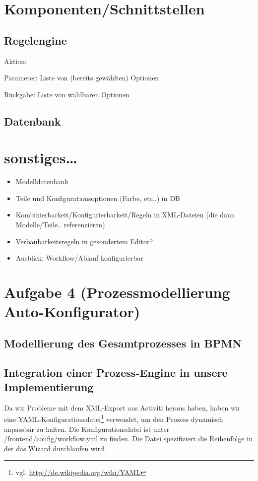 \documentclass[a4paper,10pt]{article}
\begin{document}
\section{Komponenten/Schnittstellen}

\subsection*{Regelengine}

Aktion:
 

Parameter:
 Liste von (bereits gewählten) Optionen

Rückgabe:
 Liste von wählbaren Optionen

\subsection*{Datenbank}


\section{sonstiges\ldots}
\begin{itemize}
 \item Modelldatenbank
 \item Teile und Konfigurationsoptionen (Farbe, etc..) in DB
 \item Kombinierbarkeit/Konfigurierbarkeit/Regeln in XML-Dateien (die dann Modelle/Teile.. referenzieren)
 \item Verbaubarkeitsregeln in gesondertem Editor?
 \item Ausblick: Workflow/Ablauf konfigurierbar
\end{itemize}

\section{Aufgabe 4 (Prozessmodellierung Auto-Konfigurator)}

\subsection*{Modellierung des Gesamtprozesses in BPMN}

\subsection*{Integration einer Prozess-Engine in unsere Implementierung}

Da wir Probleme mit dem XML-Export aus Activiti heraus haben, haben wir eine YAML-Konfigurationsdatei\footnote{vgl. \url{http://de.wikipedia.org/wiki/YAML}} verwendet, um den Prozess dynamisch anpassbar zu halten.
Die Konfigurationsdatei ist unter /frontend/config/workflow.yml zu finden.
Die Datei spezifiziert die Reihenfolge in der das Wizard durchlaufen wird.
\end{document}
